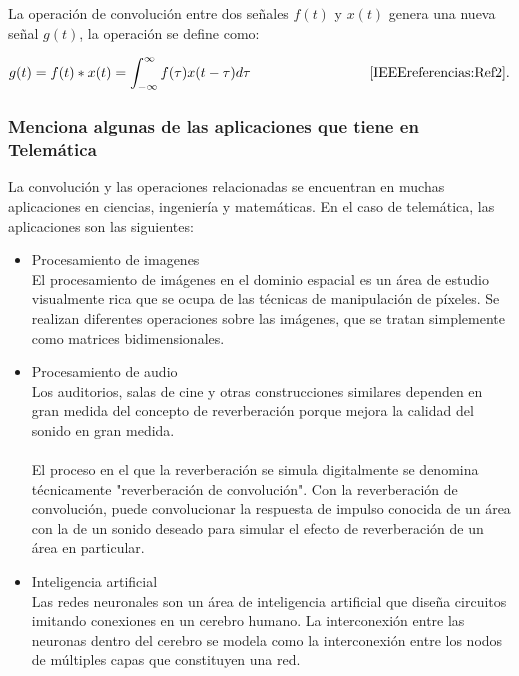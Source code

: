 \documentclass[10pt]{article}
\begin{document}
La operación de convolución entre dos señales \textbf{$f(t)$} y \textbf{$x(t)$} genera una nueva señal \textbf{$g(t)$}, la operación se define como:

\begin{equation*}
		g(t) = f(t)*x(t) = \int_{-\infty}^{\infty} f(\tau)x(t-\tau)d\tau \hspace{3cm} \cite{IEEEreferencias:Ref2}.
\end{equation*}

\subsubsection{Menciona algunas de las aplicaciones que tiene en Telemática}

La convolución y las operaciones relacionadas se encuentran en muchas aplicaciones en ciencias, ingeniería y matemáticas. En el caso de telemática, las aplicaciones son las siguientes:

\begin{itemize}
    \item Procesamiento de imagenes\\
    El procesamiento de imágenes en el dominio espacial es un área de estudio visualmente rica que se ocupa de las técnicas de manipulación de píxeles. Se realizan diferentes operaciones sobre las imágenes, que se tratan simplemente como matrices bidimensionales.
    \item Procesamiento de audio\\
    Los auditorios, salas de cine y otras construcciones similares dependen en gran medida del concepto de reverberación  porque mejora la calidad del sonido en gran medida.\\\\
    El proceso en el que la reverberación se simula digitalmente se denomina técnicamente "reverberación de convolución". Con la reverberación de convolución, puede convolucionar la respuesta de impulso conocida de un área con la de un sonido deseado para simular el efecto de reverberación de un área en particular. 
    \item Inteligencia artificial\\
    Las redes neuronales son un área de inteligencia artificial que diseña circuitos imitando conexiones en un cerebro humano. La interconexión entre las neuronas dentro del cerebro se modela como la interconexión entre los nodos de múltiples capas que constituyen una red\cite{IEEEreferencias:Ref1}.
\end{itemize}
\end{document}
